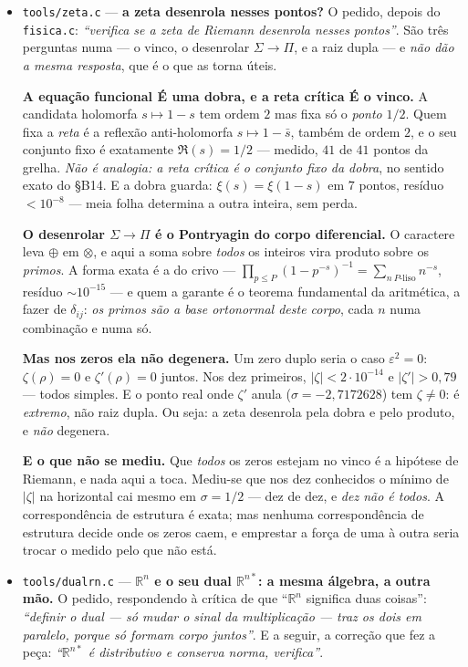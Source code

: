 \documentclass[11pt]{article}
\newcommand{\code}[1]{\texttt{\small #1}}
\newcommand{\R}{\mathbb R}
\theoremstyle{plain}
\theoremstyle{remark}
\begin{document}
\begin{itemize}
\item \code{tools/zeta.c} --- \textbf{a zeta desenrola nesses pontos?} O pedido, depois do
\code{fisica.c}: \emph{``verifica se a zeta de Riemann desenrola nesses pontos''}. São três
perguntas numa --- o vinco, o desenrolar $\Sigma\to\Pi$, e a raiz dupla --- e \emph{não dão a mesma
resposta}, que é o que as torna úteis.

\textbf{A equação funcional É uma dobra, e a reta crítica É o vinco.} A candidata holomorfa
$s\mapsto1-s$ tem ordem $2$ mas fixa só o \emph{ponto} $1/2$. Quem fixa a \emph{reta} é a reflexão
anti-holomorfa $s\mapsto1-\bar s$, também de ordem $2$, e o seu conjunto fixo é exatamente
$\Re(s)=1/2$ --- medido, $41$ de $41$ pontos da grelha. \emph{Não é analogia: a reta crítica é o
conjunto fixo da dobra}, no sentido exato do §B14. E a dobra guarda: $\xi(s)=\xi(1-s)$ em $7$
pontos, resíduo $<10^{-8}$ --- meia folha determina a outra inteira, sem perda.

\textbf{O desenrolar $\Sigma\to\Pi$ é o Pontryagin do corpo diferencial.} O caractere leva $\oplus$
em $\otimes$, e aqui a soma sobre \emph{todos} os inteiros vira produto sobre os \emph{primos}. A
forma exata é a do crivo --- $\prod_{p\le P}(1-p^{-s})^{-1}=\sum_{n\ P\text{-liso}}n^{-s}$, resíduo
$\sim10^{-15}$ --- e quem a garante é o teorema fundamental da aritmética, a fazer de $\delta_{ij}$:
\emph{os primos são a base ortonormal deste corpo}, cada $n$ numa combinação e numa só.

\textbf{Mas nos zeros ela não degenera.} Um zero duplo seria o caso $\varepsilon^2=0$: $\zeta(\rho)=0$
e $\zeta'(\rho)=0$ juntos. Nos dez primeiros, $|\zeta|<2\cdot10^{-14}$ e $|\zeta'|>0{,}79$ --- todos
simples. E o ponto real onde $\zeta'$ anula ($\sigma=-2{,}7172628$) tem $\zeta\ne0$: é
\emph{extremo}, não raiz dupla. Ou seja: a zeta desenrola pela dobra e pelo produto, e \emph{não}
degenera.

\textbf{E o que não se mediu.} Que \emph{todos} os zeros estejam no vinco é a hipótese de Riemann, e
nada aqui a toca. Mediu-se que nos dez conhecidos o mínimo de $|\zeta|$ na horizontal cai mesmo em
$\sigma=1/2$ --- dez de dez, e \emph{dez não é todos}. A correspondência de estrutura é exata; mas
nenhuma correspondência de estrutura decide onde os zeros caem, e emprestar a força de uma à outra
seria trocar o medido pelo que não está.

\item \code{tools/dualrn.c} --- \textbf{$\R^n$ e o seu dual $\R^{n*}$: a mesma álgebra, a outra
mão.} O pedido, respondendo à crítica de que ``$\R^n$ significa duas coisas'': \emph{``definir o
dual --- só mudar o sinal da multiplicação --- traz os dois em paralelo, porque só formam corpo
juntos''}. E a seguir, a correção que fez a peça: \emph{``$\R^{n*}$ é distributivo e conserva
norma, verifica''}.


\end{itemize}
\end{document}
